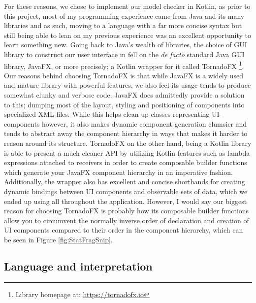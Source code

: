 For these reasons, we chose to implement our model checker in Kotlin, as prior to this project, most of my programming experience came from Java and its many libraries and as such, moving to a language with a far more concise syntax but still being able to lean on my previous experience was an excellent opportunity to learn something new. Going back to Java's wealth of libraries, the choice of GUI library to construct our user interface in fell on the \textit{de facto} standard Java GUI library, JavaFX, or more precisely; a Kotlin wrapper for it called TornadoFX \footnote{Library homepage at: \url{https://tornadofx.io}}. Our reasons behind choosing TornadoFX is that while JavaFX is a widely used and mature library with powerful features, we also feel its usage tends to produce somewhat clunky and verbose code. JavaFX does admittedly provide a solution to this; dumping most of the layout, styling and positioning of components into specialized XML-files. While this helps clean up classes representing UI-components however, it also makes dynamic component generation clumsier and tends to abstract away the component hierarchy in ways that makes it harder to reason around its structure. TornadoFX on the other hand, being a Kotlin library is able to present a much cleaner API by utilizing Kotlin features such as lambda expressions attached to receivers in order to create composable builder functions which generate your JavaFX component hierarchy in an imperative fashion. Additionally, the wrapper also has excellent and concise shorthands for creating dynamic bindings between UI components and observable sets of data, which we ended up using all throughout the application. However, I would say our biggest reason for choosing TornadoFX is probably how its composable builder functions allow you to circumvent the normally inverse order of declaration and creation of UI components compared to their order in the component hierarchy, which can be seen in Figure \ref{fig:StatFragSnip}.


\subsection{Language and interpretation}

